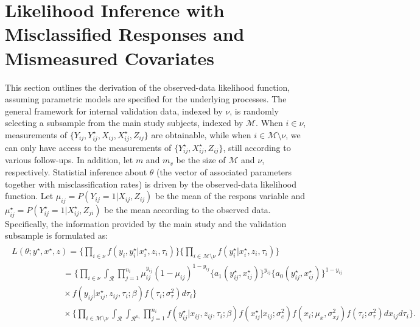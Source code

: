 \documentclass[twoside]{article}
\begin{document}
		\section{Likelihood Inference with Misclassified Responses and Mismeasured Covariates}
This section outlines the derivation of the observed-data likelihood function, assuming parametric models are specified for the underlying processes. The general framework for internal validation data, indexed by $\mathcal{\nu}$, is randomly selecting a subsample from the main study subjects, indexed by $\mathcal{M}$. When $i \in \mathcal{\nu}$, measurements of $\{Y_{ij},Y_{ij}^{\star},X_{ij},X_{ij}^{\star},Z_{ij}\}$ are obtainable, while when $i \in \mathcal{M}\setminus \mathcal{\nu}$, we can only have access to the measurements of $\{Y_{ij}^{\star},X_{ij}^{\star},Z_{ij}\}$, still according to various follow-ups. In addition, let $m$ and $m_v$ be the size of $\mathcal{M}$ and $\mathcal{\nu}$, respectively. Statistial inference about $\theta$ (the vector of associated parameters together with misclassification rates) is driven by the observed-data likelihood function. Let $\mu _{ij}=P(Y_{ij}=1|X_{ij},Z_{ij})$ be the mean of the respons variable and $\mu _{ij} ^{\star}=P(Y_{ij}^{\star}=1|X_{ij}^{\star},Z_{ji})$ be the mean according to the observed data. Specifically, the information provided by the main study and the validation subsample is formulated as:
\begin{eqnarray}\label{likeli1}
\begin{array}{l}
L(\theta;y^{\star},x^{\star},z)=\{\prod_{i \in \mathcal{\nu}}f(y_i,y_i^{\star}|x_i^{\star},z_i,\tau_i)\}\{\prod _{i \in \mathcal{M}\setminus \mathcal{\nu}}f(y_i^{\star}|x_i^{\star},z_i,\tau _i)\}\\
\qquad \qquad \qquad = \{\prod_{i \in \mathcal{\nu}} \int _\mathcal{R} \prod_{j=1}^{n_i}\mu _{ij} ^{y_{ij}}(1-\mu _{ij}) ^{1-y_{ij}}\{a_1(y_{ij}^{\star},x_{ij}^{\star})\}^{y_{ij}}\{a_0(y_{ij}^{\star},x_{ij}^{\star})\}^{1-y_{ij}}\\
\qquad \qquad \qquad \times f(y_{ij}|x_{ij}^{\star},z_{ij},\tau_i;\beta)f(\tau_i;\sigma _{\tau}^2)d\tau _i\} \\
\qquad \qquad \qquad \times \{\prod _{i \in \mathcal{M}\setminus \mathcal{\nu}}\int_{\mathcal{R}}\int_{\mathcal{R}^{n_i}}\prod_{j=1}^{n_i}f(y_{ij}^{\star}|x_{ij},z_{ij},\tau _i;\beta)f(x_{ij}^{\star}|x_{ij};\sigma_e^2)f(x_{i};\mu_x,\sigma_{xj}^2)f(\tau _i;\sigma _{\tau}^2)dx_{ij}d\tau _i \}.
\end{array}
\end{eqnarray}
\end{document}
